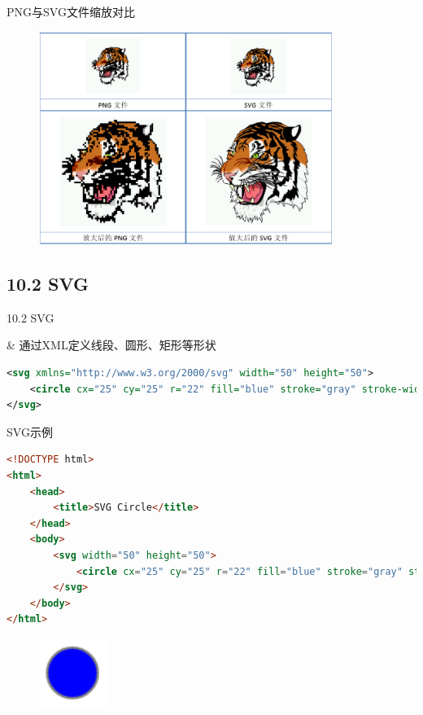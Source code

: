 \begin{frame}[fragile]{PNG与SVG文件缩放对比}
\begin{figure}
    \includegraphics[width=0.85\textwidth]{figure/app-svg-vs-png.png}
\end{figure}
\end{frame}


\subsection{10.2 SVG}

\begin{frame}[fragile]{10.2 SVG}
\begin{easylist} \easyitem
& 通过XML定义线段、圆形、矩形等形状
\begin{lstlisting}[tabsize=8, basicstyle=\small\tt, language=XML]
<svg xmlns="http://www.w3.org/2000/svg" width="50" height="50">
    <circle cx="25" cy="25" r="22" fill="blue" stroke="gray" stroke-width="2"/>
</svg>
\end{lstlisting}
\end{easylist}
\end{frame}


\begin{frame}{SVG示例}
\begin{lstlisting}[tabsize=8, basicstyle=\small\tt, language=HTML, caption="circle.html"]
<!DOCTYPE html>
<html>
    <head>
        <title>SVG Circle</title>
    </head>
    <body>
        <svg width="50" height="50">
            <circle cx="25" cy="25" r="22" fill="blue" stroke="gray" stroke-width="2"/>
        </svg>
    </body>
</html>
\end{lstlisting}

\begin{figure}
    \includegraphics[width=0.2\textwidth]{figure/app-circle.png}
\end{figure}
\end{frame}


